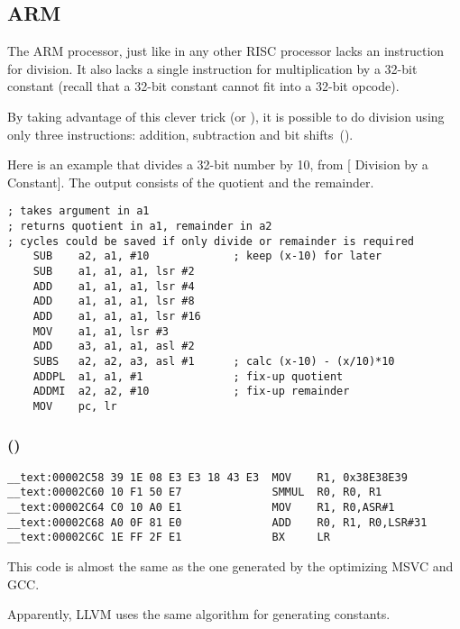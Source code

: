 ﻿\subsection{ARM}

The ARM processor, just like in any other  RISC processor lacks an instruction for division.
It also lacks a single instruction for multiplication by a 32-bit constant (recall that a 32-bit
constant cannot fit into a 32-bit opcode).

By taking advantage of this clever trick (or ), it is possible to do division using only three instructions: addition,
subtraction and bit shifts~().

Here is an example that divides a 32-bit number by 10, from
[ Division by a Constant].
The output consists of the quotient and the remainder.

\begin{lstlisting}
; takes argument in a1
; returns quotient in a1, remainder in a2
; cycles could be saved if only divide or remainder is required
    SUB    a2, a1, #10             ; keep (x-10) for later
    SUB    a1, a1, a1, lsr #2
    ADD    a1, a1, a1, lsr #4
    ADD    a1, a1, a1, lsr #8
    ADD    a1, a1, a1, lsr #16
    MOV    a1, a1, lsr #3
    ADD    a3, a1, a1, asl #2
    SUBS   a2, a2, a3, asl #1      ; calc (x-10) - (x/10)*10
    ADDPL  a1, a1, #1              ; fix-up quotient
    ADDMI  a2, a2, #10             ; fix-up remainder
    MOV    pc, lr
\end{lstlisting}

\subsubsection{\OptimizingXcodeIV (\ARMMode)}

\begin{lstlisting}
__text:00002C58 39 1E 08 E3 E3 18 43 E3  MOV    R1, 0x38E38E39
__text:00002C60 10 F1 50 E7              SMMUL  R0, R0, R1
__text:00002C64 C0 10 A0 E1              MOV    R1, R0,ASR#1
__text:00002C68 A0 0F 81 E0              ADD    R0, R1, R0,LSR#31
__text:00002C6C 1E FF 2F E1              BX     LR
\end{lstlisting}

This code is almost the same as the one generated by the optimizing MSVC and GCC.

Apparently, LLVM uses the same algorithm for generating constants.


